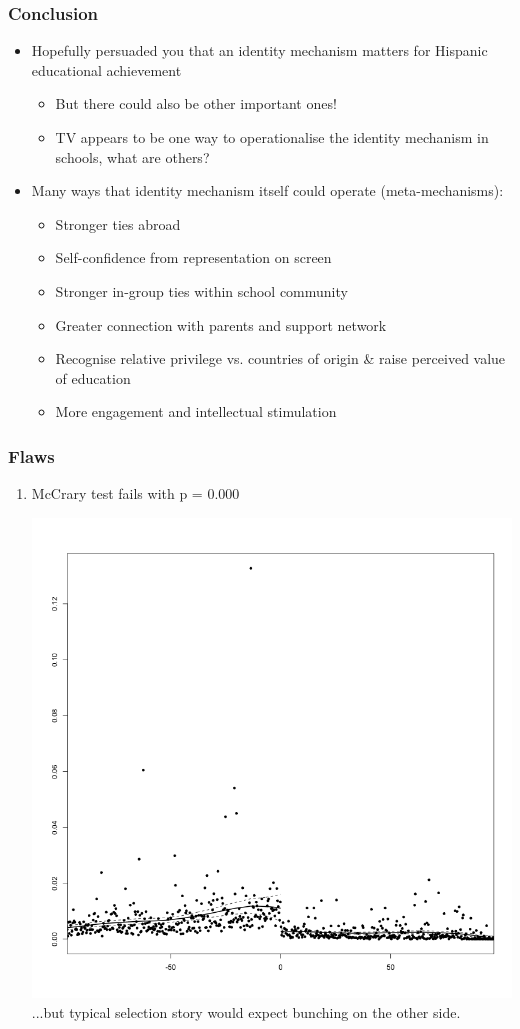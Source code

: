 \documentclass{beamer}
\begin{document}
\begin{frame}
\frametitle{Conclusion}
\begin{itemize}
\item Hopefully persuaded you that an identity mechanism matters for Hispanic educational achievement
\begin{itemize}
\item But there could also be other important ones!
\item TV appears to be one way to operationalise the identity mechanism in schools, what are others?
\end{itemize}
\item Many ways that identity mechanism itself could operate (meta-mechanisms): 
\begin{itemize}
\footnotesize
\item Stronger ties abroad
\item Self-confidence from representation on screen
\item Stronger in-group ties within school community
\item Greater connection with parents and support network
\item Recognise relative privilege vs. countries of origin \& raise perceived value of education
\item More engagement and intellectual stimulation 
\end{itemize}

\end{itemize}
\end{frame}



\begin{frame}
\frametitle{Flaws}
\begin{enumerate}
\item McCrary test fails with p = 0.000

\includegraphics[width=.6\textwidth]{../../explore/Output/Diagnostics/McCrary2.png}\\
...but typical selection story would expect bunching on the other side. 

\end{enumerate}
\end{frame}
\end{document}

